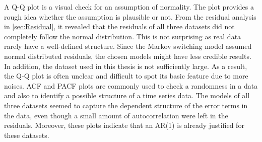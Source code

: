 A Q-Q plot is a visual check for an assumption of normality. The plot
provides a rough idea whether the assumption is plausible or not.
From the residual analysis in \ref{sec:Residual}, it revealed that
the residuals of all three datasets did not completely follow the
normal distribution. This is not surprising as real data rarely have
a well-defined structure. Since the Markov switching model assumed
normal distributed residuals, the chosen models might have less credible
results. In addition, the dataset used in this thesis is not sufficiently
large. As a result, the Q-Q plot is often unclear and difficult to
spot its basic feature due to more noises. ACF and PACF plots are
commonly used to check a randomness in a data and also to identify
a possible structure of a time series data. The models of all three
datasets seemed to capture the dependent structure of the error terms
in the data, even though a small amount of autocorrelation were left
in the residuals. Moreover, these plots indicate that an AR(1) is
already justified for these datasets. %
\begin{comment}
The assumption of a normally distributed residuals is justified for
software release B.

If the residuals appear to behave randomly, it suggests that the model
fits the data well.

randomness tends to obscure the actual behavior especially with small
data

Furthermore, the model is able to capture the pattern of data rather
well.

The model seems to capture the dependent structure of the error terms
in the time series, except for the reported significant lag. 

heavy tail = high variance

independent of noise terms

There is an outlier in the residuals (2004:Q4) which suggests there
was something unusual happening in that quarter. It would be worth
investigating that outlier to see if there were any unusual circumstances
or events that may have reduced beer production for the quarter.

The remaining residuals show that the model has captured the patterns
in the data quite well, although there is a small amount of autocorrelation
left in the residuals (seen in the significant spike in the ACF plot).
This suggests that the model can be slightly improved, although it
is unlikely to make much difference to the resulting forecasts.
\end{comment}

